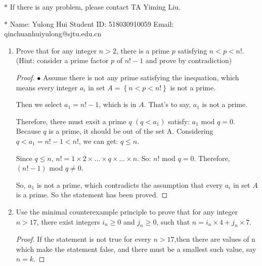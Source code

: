 \documentclass[12pt,a4paper]{article}
\theoremstyle{definition}
\begin{document}
\noindent

\noindent{}
\begin{center}
\footnotesize{\color{red}$*$ If there is any problem, please contact TA Yiming Liu.}

\footnotesize{\color{blue}$*$ Name: Yulong Hui  \quad Student ID: 518030910059 \quad Email: qinchuanhuiyulong@sjtu.edu.cn }
\end{center}

\begin{enumerate}
    \item
    Prove that for any integer $n>2$, there is a prime $p$ satisfying $n<p<n!$. {\color{blue}(Hint: consider a prime factor $p$ of $n!-1$ and prove by contradiction)}
    \begin{proof}
    	
    	$\bullet$ Assume there is not any prime  satisfying the inequation, which means every integer $a_i$ in set $A=\left\{n<p<n!\right\}$  is not a prime.
        
        Then we select $a_1=n!-1$, which is in $A$. That's to say, $a_1$ is not a prime.
        
        Therefore, there must exsit a prime $q$ $(q<a_1)$ satisfy: $a_1$ mod $q=0$. Because $q$ is a prime, it should be out of the set A. Considering $q<a_1=n!-1<n!$, we can get: $q\leq n$. 
        
        Since $q\leq n$, $n!=1\times 2\times ...\times q \times...\times n$. So: $n!$ mod $q=0$. Therefore, $(n!-1)$ mod $q\neq 0$.
        
        So, $a_1$ is not a prime, which contradicts the assumption that every $a_i$ in set $A$ is a prime. So the statement has been proved. 
        
    \end{proof}

    \item
    Use the minimal counterexample principle to prove that for any integer $n>17$, there exist integers $i_n\ge 0$ and $j_n\ge 0$, such that $n = i_n \times 4 + j_n \times 7$.
    \begin{proof}
        If the statement is not true for every $n>17$,then there are values of n which make the statement false, and there must be a smallest such value, say $n=k$.
        

\end{proof}
\end{enumerate}
\end{document}
